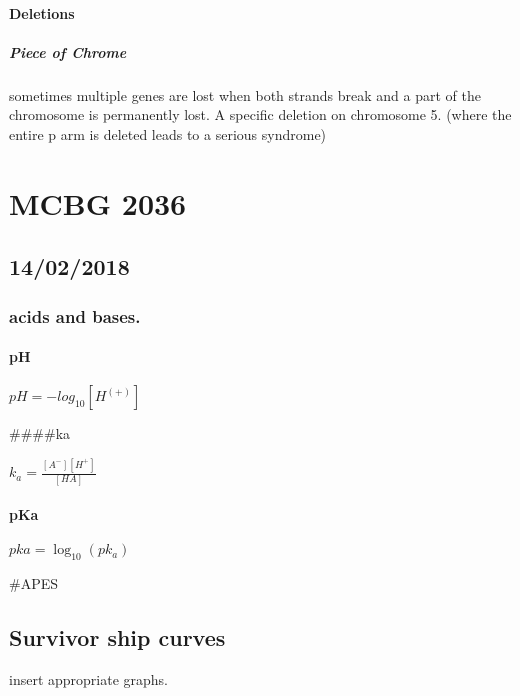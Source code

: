 \documentclass[]{article}
\let\oldparagraph\paragraph
\renewcommand{\paragraph}[1]{\oldparagraph{#1}\mbox{}}
\let\oldsubparagraph\subparagraph
\renewcommand{\subparagraph}[1]{\oldsubparagraph{#1}\mbox{}}
\begin{document}
\hypertarget{deletions}{%
\paragraph{Deletions}\label{deletions}}

\hypertarget{piece-of-chrome}{%
\subparagraph{Piece of Chrome}\label{piece-of-chrome}}

sometimes multiple genes are lost when both strands break and a part of
the chromosome is permanently lost. A specific deletion on chromosome 5.
(where the entire p arm is deleted leads to a serious syndrome)

\hypertarget{mcbg-2036}{%
\section{MCBG 2036}\label{mcbg-2036}}

\hypertarget{section-1}{%
\subsection{14/02/2018}\label{section-1}}

\hypertarget{acids-and-bases.}{%
\subsubsection{acids and bases.}\label{acids-and-bases.}}

\hypertarget{ph}{%
\paragraph{pH}\label{ph}}

\(pH=-log_{10}[H^(+)]\)

\#\#\#\#ka

\(k_{a}=\frac{[A^{-}][H^+]}{[HA]}\)

\hypertarget{pka}{%
\paragraph{pKa}\label{pka}}

\(pka=\log_{10}(pk_a)\)

\#APES

\hypertarget{survivor-ship-curves}{%
\subsection{Survivor ship curves}\label{survivor-ship-curves}}

insert appropriate graphs.
\end{document}
